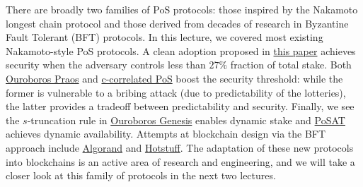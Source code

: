 \documentclass{article}
\begin{document}
There are broadly two families of PoS protocols: those inspired by the Nakamoto longest chain protocol and those derived from decades of research in Byzantine Fault Tolerant (BFT) protocols. In this lecture, we covered most existing Nakamoto-style PoS protocols. A clean adoption proposed in  \href{https://eprint.iacr.org/2017/656}{this paper}  achieves security when the adversary controls less than $27\%$ fraction of total stake. Both \href{https://eprint.iacr.org/2017/573.pdf}{Ouroboros Praos} and \href{https://arxiv.org/pdf/1910.02218.pdf}{c-correlated PoS} boost the security threshold: while the former is vulnerable to a bribing attack (due to predictability of the lotteries), the latter provides a tradeoff between predictability and security. Finally, we see the $s$-truncation rule in \href{https://eprint.iacr.org/2018/378.pdf}{Ouroboros Genesis} enables dynamic stake and \href{https://arxiv.org/pdf/2010.08154.pdf}{PoSAT} achieves dynamic availability.
Attempts at blockchain design via the BFT approach include \href{https://algorandcom.cdn.prismic.io/algorandcom\%2Fa26acb80-b80c-46ff-a1ab-a8121f74f3a3_p51-gilad.pdf}{Algorand} and \href{hotstuff: bft consensus with linearity and responsiveness}{Hotstuff}. The adaptation of these new protocols into blockchains is an active area of research and engineering, and we will take a closer look at this family of protocols in the next two lectures.
\end{document}
